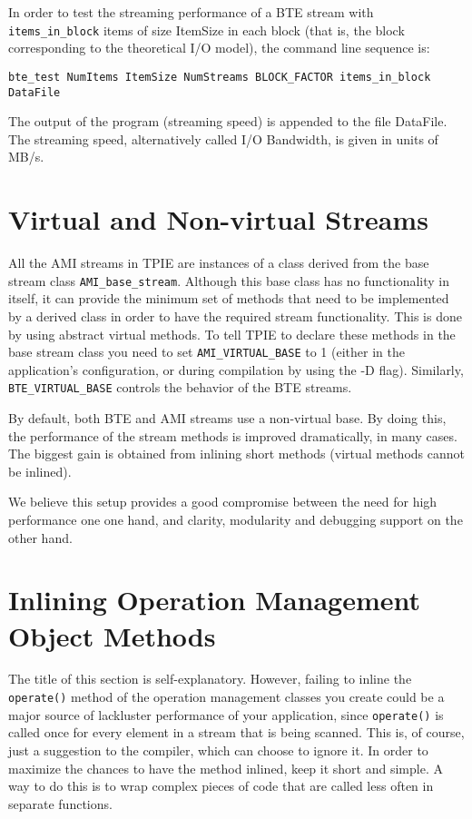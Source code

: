 In order to test the streaming performance of a BTE stream with 
\verb|items_in_block| items of size ItemSize in each block (that is, the
block corresponding to the theoretical I/O model), the command line 
sequence is:

\begin{verbatim}
bte_test NumItems ItemSize NumStreams BLOCK_FACTOR items_in_block DataFile 
\end{verbatim}

The output of the program (streaming speed) is appended to the file
DataFile. The streaming speed, alternatively called I/O Bandwidth,
is given in units of MB/s.

\section{Virtual and Non-virtual Streams}

All the AMI streams in TPIE are instances of a class derived from the base
stream class \verb|AMI_base_stream|. Although this base class has no
functionality in itself, it can provide the minimum set of methods that
need to be implemented by a derived class in order to have the required
stream functionality. This is done by using abstract virtual methods. To
tell TPIE to declare these methods in the base stream class you need to
set \verb|AMI_VIRTUAL_BASE| to 1 (either in the application's
configuration, or during compilation by using the -D flag). Similarly,
\verb|BTE_VIRTUAL_BASE| controls the behavior of the BTE streams.

By default, both BTE and AMI streams use a non-virtual base. By doing this,
the performance of the stream methods is improved dramatically, in many
cases. The biggest gain is obtained from inlining short methods (virtual
methods cannot be inlined). 

We believe this setup provides a good compromise between the need for high
performance one one hand, and clarity, modularity and debugging support on
the other hand.


\section{Inlining Operation Management Object Methods}

The title of this section is self-explanatory. However, failing to inline
the \verb|operate()| method of the operation management classes you create
could be a major source of lackluster performance of your application,
since \verb|operate()| is called once for every element in a stream that is
being scanned. This is, of course, just a suggestion to the compiler, which
can choose to ignore it. In order to maximize the chances to have the
method inlined, keep it short and simple. A way to do this is to wrap
complex pieces of code that are called less often in separate functions.

